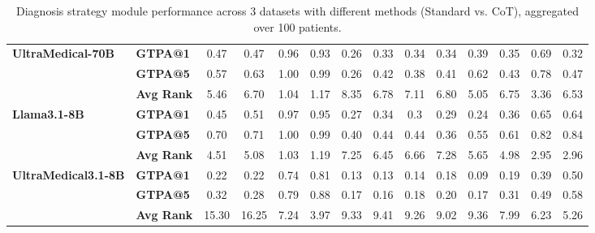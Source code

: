 \begin{table*}[h]
\begin{tabular}{l l cccc cccc cccc}
    \midrule
    \multirow{3}{*}{\textbf{UltraMedical-70B}}  
    & \textbf{GTPA@1} & 0.47 & 0.47 & 0.96 & 0.93 & 0.26 & 0.33 & 0.34 & 0.34 & 0.39 & 0.35 & 0.69 & 0.32 \\
   & \textbf{GTPA@5} & 0.57 & 0.63 & 1.00& 0.99 & 0.26 & 0.42 & 0.38 & 0.41 & 0.62 & 0.43 & 0.78 & 0.47 \\
    & \textbf{Avg Rank} & 5.46 & 6.70& 1.04 & 1.17 & 8.35 & 6.78 & 7.11 & 6.80& 5.05 & 6.75 & 3.36 & 6.53 \\
    \midrule
    \multirow{3}{*}{\textbf{Llama3.1-8B}}  
    & \textbf{GTPA@1} & 0.45 & 0.51 & 0.97 & 0.95 & 0.27 & 0.34 & 0.3 & 0.29 & 0.24 & 0.36 & 0.65 & 0.64 \\
   & \textbf{GTPA@5} & 0.70& 0.71 & 1.00& 0.99 & 0.40& 0.44 & 0.44 & 0.36 & 0.55 & 0.61 & 0.82 & 0.84 \\
    & \textbf{Avg Rank} & 4.51 & 5.08 & 1.03 & 1.19 & 7.25 & 6.45 & 6.66 & 7.28 & 5.65 & 4.98 & 2.95 & 2.96 \\
    \midrule
    \multirow{3}{*}{\textbf{UltraMedical3.1-8B}} 
    & \textbf{GTPA@1} & 0.22 & 0.22 & 0.74 & 0.81 & 0.13 & 0.13 & 0.14 & 0.18 & 0.09 & 0.19 & 0.39 & 0.50 \\
   & \textbf{GTPA@5} & 0.32 & 0.28 & 0.79 & 0.88 & 0.17 & 0.16 & 0.18 & 0.20& 0.17 & 0.31 & 0.49 & 0.58 \\
    & \textbf{Avg Rank} & 15.30 & 16.25 & 7.24 & 3.97 & 9.33 & 9.41 & 9.26 & 9.02 & 9.36 & 7.99 & 6.23 & 5.26 \\
    
    \bottomrule
    \end{tabular}
    \caption{Diagnosis strategy module performance across 3 datasets with different methods (Standard vs. CoT), aggregated over 100 patients.} %
    \label{tab:performance_diagnosis}
\end{table*}


